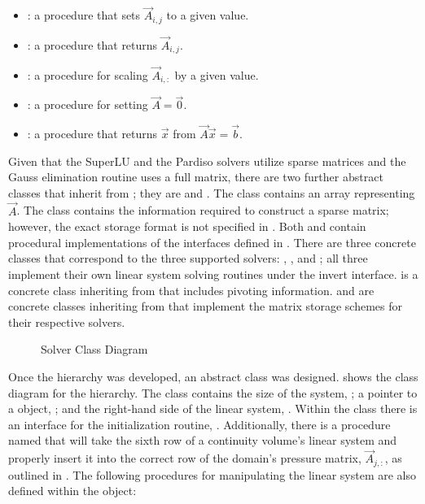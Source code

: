 \begin{itemize}
\item{: a procedure that sets $\vec{A}_{i,j}$ to a given value.}
\item{: a procedure that returns $\vec{A}_{i,j}$.}
\item{: a procedure for scaling $\vec{A}_{i, :}$ by a given value.}
\item{: a procedure for setting $\vec{A} = \vec{0}$.}
\item{: a procedure that returns $\vec{x}$ from $\vec{A}\vec{x} = \vec{b}$.}
\end{itemize}

Given that the SuperLU and the Pardiso solvers utilize sparse matrices and the Gauss elimination routine uses a full matrix, there are two further abstract classes that inherit from ; they are  and .
The  class contains an array representing $\vec{A}$.
The  class contains the information required to construct a sparse matrix; however, the exact storage format is not specified in .
Both  and  contain procedural implementations of the interfaces defined in .
There are three concrete classes that correspond to the three supported solvers: , , and ; all three implement their own linear system solving routines under the invert interface.
 is a concrete class inheriting from  that includes pivoting information.
 and  are concrete classes inheriting from  that implement the matrix storage schemes for their respective solvers.

\begin{figure}[ht!]
\singlespace\centering

\caption{Solver Class Diagram}
\label{fig:solverClassDiagram}
\end{figure}

Once the  hierarchy was developed, an abstract  class was designed.
 shows the class diagram for the  hierarchy.
The  class contains the size of the system, ; a pointer to a  object, ; and the right-hand side of the linear system, .
Within the  class there is an interface for the initialization routine, .
Additionally, there is a procedure named  that will take the sixth row of a continuity volume's linear system and properly insert it into the correct row of the domain's pressure matrix, $\vec{A}_{j,:}$, as outlined in .
The following procedures for manipulating the linear system are also defined within the  object:

